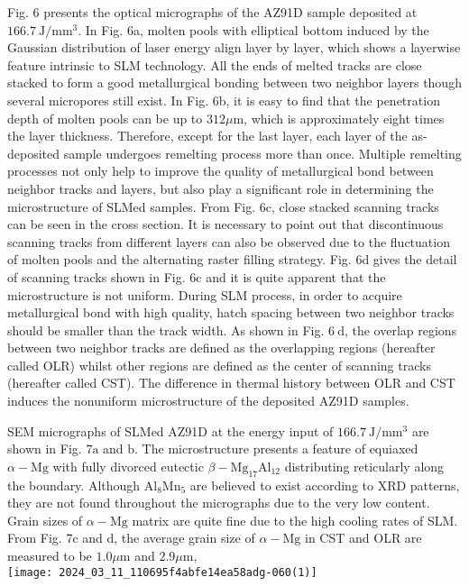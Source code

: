 \documentclass[10pt]{article}
\begin{document}
Fig. 6 presents the optical micrographs of the AZ91D sample deposited at $166.7 \mathrm{~J} / \mathrm{mm}^{3}$. In Fig. 6a, molten pools with elliptical bottom induced by the Gaussian distribution of laser energy align layer by layer, which shows a layerwise feature intrinsic to SLM technology. All the ends of melted tracks are close stacked to form a good metallurgical bonding between two neighbor layers though several micropores still exist. In Fig. 6b, it is easy to find that the penetration depth of molten pools can be up to $312 \mu \mathrm{m}$, which is approximately eight times the layer thickness. Therefore, except for the last layer, each layer of the as-deposited sample undergoes remelting process more than once. Multiple remelting processes not only help to improve the quality of metallurgical bond between neighbor tracks and layers, but also play a significant role in determining the microstructure of SLMed samples. From Fig. 6c, close stacked scanning tracks can be seen in the cross section. It is necessary to point out that discontinuous scanning tracks from different layers can also be observed due to the fluctuation of molten pools and the alternating raster filling strategy. Fig. 6d gives the detail of scanning tracks shown in Fig. $6 \mathrm{c}$ and it is quite apparent that the microstructure is not uniform. During SLM process, in order to acquire metallurgical bond with high quality, hatch spacing between two neighbor tracks should be smaller than the track width. As shown in Fig. $6 \mathrm{~d}$, the overlap regions between two neighbor tracks are defined as the overlapping regions (hereafter called OLR) whilst other regions are defined as the center of scanning tracks (hereafter called CST). The difference in thermal history between OLR and CST induces the nonuniform microstructure of the deposited AZ91D samples.

SEM micrographs of SLMed AZ91D at the energy input of $166.7 \mathrm{~J} / \mathrm{mm}^{3}$ are shown in Fig. $7 \mathrm{a}$ and b. The microstructure presents a feature of equiaxed $\alpha-\mathrm{Mg}$ with fully divorced eutectic $\beta-\mathrm{Mg}_{17} \mathrm{Al}_{12}$ distributing reticularly along the boundary. Although $\mathrm{Al}_{8} \mathrm{Mn}_{5}$ are believed to exist according to XRD patterns, they are not found throughout the micrographs due to the very low content. Grain sizes of $\alpha-\mathrm{Mg}$ matrix are quite fine due to the high cooling rates of SLM. From Fig. 7c and d, the average grain size of $\alpha-\mathrm{Mg}$ in CST and OLR are measured to be $1.0 \mu \mathrm{m}$ and $2.9 \mu \mathrm{m}$,\\
\texttt{[image: 2024\_03\_11\_110695f4abfe14ea58adg-060(1)]}
\end{document}

